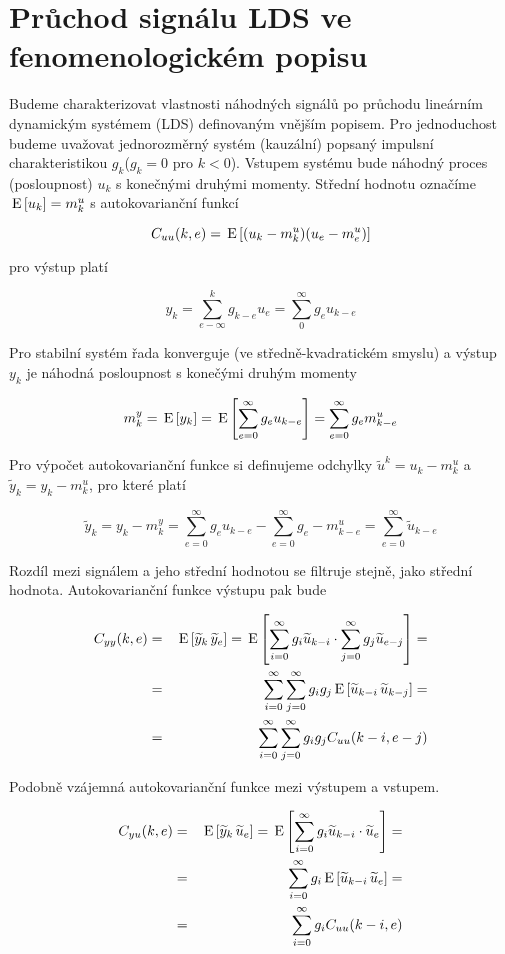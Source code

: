 \chapter{Průchod signálu LDS ve fenomenologickém popisu}
Budeme charakterizovat vlastnosti náhodných signálů po průchodu lineárním dynamickým systémem (LDS) definovaným vnějším popisem. Pro jednoduchost budeme uvažovat jednorozměrný systém (kauzální) popsaný impulsní charakteristikou $g_k$($g_k=0$ pro $k<0$). Vstupem systému bude náhodný proces (posloupnost) $u_k$ s konečnými druhými momenty. Střední hodnotu označíme $\,\mathrm{E}\left[u_k\right]=m_k^u$ s autokovarianční funkcí

\[ C_{uu}(k,e) = \,\mathrm{E}\left[(u_k-m_k^u)(u_e-m_e^u)\right] \]

pro výstup platí

\[ y_k = \sum_{e-\infty}^k g_{k-e}u_e=\sum_0^{\infty} g_e u _{k-e} \]

Pro stabilní systém řada konverguje (ve středně-kvadratickém smyslu) a výstup $y_k$ je náhodná posloupnost s konečými druhým momenty

\[ m_k^y = \,\mathrm{E}\left[y_k\right]=\,\mathrm{E}\left[\sum_{e=0}^\infty g_eu_{k-e} \right] = \sum_{e=0}^\infty g_em_{k-e}^u \]

Pro výpočet autokovarianční funkce si definujeme odchylky $\widetilde{u}^k=u_k-m_k^u$ a $\widetilde{y}_k=y_k-m_k^u$, pro které platí

\[
\widetilde{y}_k = y_k-m_k^y = \sum_{e=0}^\infty g_e u_{k-e}-\sum_{e=0}^\infty g_e-m_{k-e}^u=\sum_{e=0}^\infty\widetilde{u}_{k-e}
\]

Rozdíl mezi signálem a jeho střední hodnotou se filtruje stejně, jako střední hodnota. Autokovarianční funkce výstupu pak bude

\begin{eqnarray*}
C_{yy}(k,e) &=& \,\mathrm{E}\left[\widetilde{y}_k\, \widetilde{y}_e\right]=\,\mathrm{E}\left[ \sum_{i=0}^\infty g_i \widetilde{u}_{k-i}\cdot \sum_{j=0}^\infty g_j\widetilde{u}_{e-j} \right] = \\
& = & \sum_{i=0}^\infty \sum_{j=0}^\infty g_i g_j\,\mathrm{E}\left[\widetilde{u}_{k-i}\, \widetilde{u}_{k-j}\right] = \\
& = & \sum_{i=0}^\infty \sum_{j=0}^\infty g_i g_j C_{uu}(k-i,e-j)
\end{eqnarray*}

Podobně vzájemná autokovarianční funkce mezi výstupem a vstupem.

\begin{eqnarray*}
C_{yu}(k,e) &=& \,\mathrm{E}\left[\widetilde{y}_k\, \widetilde{u}_e\right]=\,\mathrm{E}\left[ \sum_{i=0}^\infty g_i \widetilde{u}_{k-i}\cdot \widetilde{u}_e \right] = \\
& = & \sum_{i=0}^\infty g_i\,\mathrm{E}\left[\widetilde{u}_{k-i}\, \widetilde{u}_{e}\right] = \\
& = & \sum_{i=0}^\infty g_i C_{uu}(k-i,e)
\end{eqnarray*}

